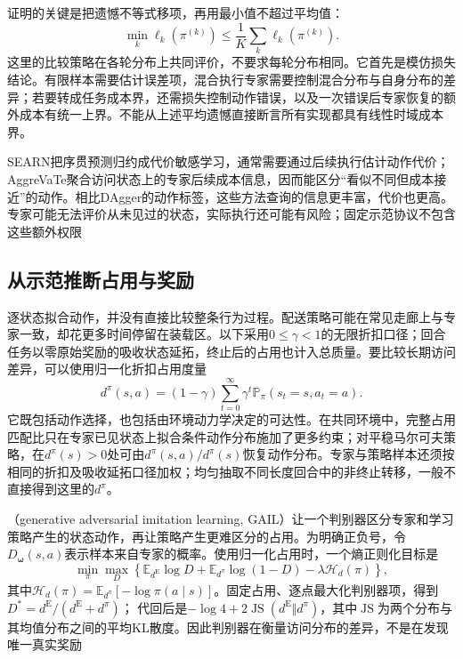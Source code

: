 证明的关键是把遗憾不等式移项，再用最小值不超过平均值：
\[
  \min_k\ell_k(\pi^{(k)})
  \leq\frac1K\sum_k\ell_k(\pi^{(k)}).
\]
这里的比较策略在各轮分布上共同评价，不要求每轮分布相同。它首先是模仿损失结论。有限样本需要估计误差项，混合执行专家需要控制混合分布与自身分布的差异；若要转成任务成本界，还需损失控制动作错误，以及一次错误后专家恢复的额外成本有统一上界。不能从上述平均遗憾直接断言所有实现都具有线性时域成本界。

SEARN把序贯预测归约成代价敏感学习，通常需要通过后续执行估计动作代价；AggreVaTe聚合访问状态上的专家后续成本信息，因而能区分“看似不同但成本接近”的动作。相比DAgger的动作标签，这些方法查询的信息更丰富，代价也更高。专家可能无法评价从未见过的状态，实际执行还可能有风险；固定示范协议不包含这些额外权限

\subsection{从示范推断占用与奖励}
\label{sec:rl-reward-occupancy-irl}

逐状态拟合动作，并没有直接比较整条行为过程。配送策略可能在常见走廊上与专家一致，却花更多时间停留在装载区。以下采用$0\leq\gamma<1$的无限折扣口径；回合任务以零原始奖励的吸收状态延拓，终止后的占用也计入总质量。要比较长期访问差异，可以使用归一化折扣占用度量
\begin{equation}
  d^\pi(s,a)=(1-\gamma)\sum_{t=0}^{\infty}
       \gamma^t\mathbb P_\pi(s_t=s,a_t=a).
  \label{eq:rl-reward-occupancy}
\end{equation}
它既包括动作选择，也包括由环境动力学决定的可达性。在共同环境中，完整占用匹配比只在专家已见状态上拟合条件动作分布施加了更多约束；对平稳马尔可夫策略，在$d^\pi(s)>0$处可由$d^\pi(s,a)/d^\pi(s)$恢复动作分布。专家与策略样本还须按相同的折扣及吸收延拓口径加权；均匀抽取不同长度回合中的非终止转移，一般不直接得到这里的$d^\pi$。

（generative adversarial imitation learning, GAIL）让一个判别器区分专家和学习策略产生的状态动作，再让策略产生更难区分的占用。为明确正负号，令$D_{\bm{\omega}}(s,a)$表示样本来自专家的概率。使用归一化占用时，一个熵正则化目标是
\begin{equation}
  \min_\pi\max_D
  \left\{\mathbb E_{d^{\mathrm E}}\log D
    +\mathbb E_{d^\pi}\log(1-D)
    -\lambda\mathcal H_d(\pi)\right\},
  \label{eq:rl-reward-gail}
\end{equation}
其中$\mathcal H_d(\pi)=\mathbb E_{d^\pi}[-\log\pi(a\mid s)]$。固定占用、逐点最大化判别器项，得到
$D^*=d^{\mathrm E}/(d^{\mathrm E}+d^\pi)$；
代回后是$-\log4+2\operatorname{JS}(d^{\mathrm E}\Vert d^\pi)$，其中$\operatorname{JS}$为两个分布与其均值分布之间的平均KL散度。因此判别器在衡量访问分布的差异，不是在发现唯一真实奖励

